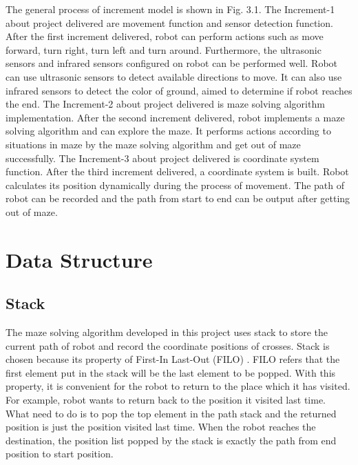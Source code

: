\documentclass[11pt,times,oneside,openright,hardcopy]{eeereport}
\begin{document}
The general process of increment model is shown in Fig. 3.1.
The Increment-1 about project delivered are movement function and sensor detection function. After the first increment delivered, robot can perform actions such as move forward, turn right, turn left and turn around.
Furthermore, the ultrasonic sensors and infrared sensors configured on robot can be performed well. Robot can use ultrasonic sensors to detect available directions to move. It can also use infrared sensors to detect the color of ground, aimed to determine if robot reaches the end. 
The Increment-2 about project delivered is maze solving algorithm implementation. After the second increment delivered, robot implements a maze solving algorithm and can explore the maze. 
It performs actions according to situations in maze by the maze solving algorithm and get out of maze successfully.
The Increment-3 about project delivered is coordinate system function. After the third increment delivered, a coordinate system is built. Robot calculates its position dynamically during the process of movement. The path of robot can be recorded and the path from start to end can be output
after getting out of maze. 



\section{Data Structure}
\subsection{Stack}
The maze solving algorithm developed in this project uses stack to store the current path of robot and record the coordinate positions of crosses. Stack is chosen because its property of First-In Last-Out (FILO) \cite{Roser:2015ez}. FILO refers that the first element put in the stack will be the last element to be popped. With this property, 
it is convenient for the robot to return to the place which it has visited. For example, robot wants to return back to the position it visited last time. What need to do is to pop the top element in the path stack and the returned position is just the position visited last time.
When the robot reaches the destination, the position list popped by the stack is exactly the path from end position to start position.
\end{document}
